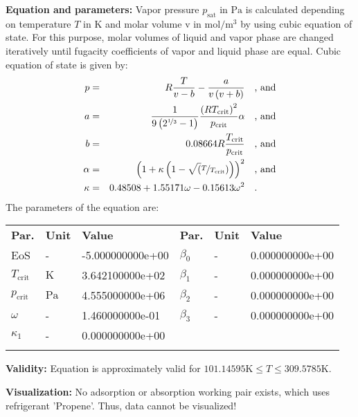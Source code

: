 \textbf{Equation and parameters:}
\newline
%
Vapor pressure $p_\mathrm{sat}$ in $\si{\pascal}$ is calculated depending on temperature $T$ in $\si{\kelvin}$ and molar volume v in $\si{\mole\per\cubic\meter}$ by using cubic equation of state. For this purpose, molar volumes of liquid and vapor phase are changed iteratively until fugacity coefficients of vapor and liquid phase are equal. Cubic equation of state is given by:
\begin{equation*}
\begin{split}
p &=& R \frac{T}{v - b} - \frac{a}{v \left(v + b\right)} & \quad\text{, and} \\
a &=& \frac{1}{9 \left(2^{\nicefrac{1}{3}} - 1\right)} \frac{\left(R T_\mathrm{crit} \right)^2}{p_\mathrm{crit}} \alpha & \quad\text{, and} \\
b &=& 0.08664 R \frac{T_\mathrm{crit}}{p_\mathrm{crit}} & \quad\text{, and} \\
\alpha &=& \left(1 + \kappa \left(1 - \sqrt(\nicefrac{T}{T_\mathrm{crit}}) \right) \right)^2 & \quad\text{, and} \\
\kappa &=& 0.48508 + 1.55171 \omega - 0.15613 \omega^2 & \quad\text{.}
\end{split}
\end{equation*}
%
The parameters of the equation are:
%
\begin{longtable}[l]{lll|lll}
\toprule
\addlinespace
\textbf{Par.} & \textbf{Unit} & \textbf{Value} &	\textbf{Par.} & \textbf{Unit} & \textbf{Value} \\
\addlinespace
\midrule
\endhead

\bottomrule
\endfoot
\bottomrule
\endlastfoot
\addlinespace

EoS & - & -5.000000000e+00 & $\beta_0$ & - & 0.000000000e+00 \\
$T_\mathrm{crit}$ & $\si{\kelvin}$ & 3.642100000e+02 & $\beta_1$ & - & 0.000000000e+00 \\
$p_\mathrm{crit}$ & $\si{\pascal}$ & 4.555000000e+06 & $\beta_2$ & - & 0.000000000e+00 \\
$\omega$ & - & 1.460000000e-01 & $\beta_3$ & - & 0.000000000e+00 \\
$\kappa_1$ & - & 0.000000000e+00 & & & \\

\addlinespace\end{longtable}

\textbf{Validity:}
\newline
Equation is approximately valid for $101.14595 \si{\kelvin} \leq T \leq 309.5785 \si{\kelvin}$.
\newline

\textbf{Visualization:}
%
\newline
No adsorption or absorption working pair exists, which uses refrigerant 'Propene'. Thus, data cannot be visualized!
%

\FloatBarrier
\newpage
